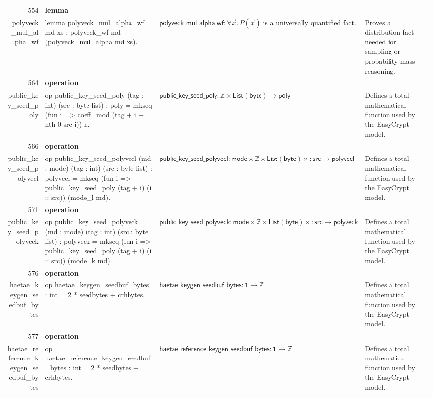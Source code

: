 \documentclass[10pt]{article}
\newcommand{\ec}[1]{\begingroup\ttfamily\scriptsize #1\endgroup}
\begin{document}
\begin{longtable}{r L{0.17\textwidth} L{0.26\textwidth} L{0.27\textwidth} L{0.20\textwidth}}
554 & \textbf{lemma}\\\ec{polyveck\_mul\_alpha\_wf} & \ec{lemma polyveck\_mul\_alpha\_wf md xs : polyveck\_wf md (polyveck\_mul\_alpha md xs).} & \(\mathsf{polyveck\_mul\_alpha\_wf} : \forall \vec{x}.\, P(\vec{x})\) is a universally quantified fact. & Proves a distribution fact needed for sampling or probability mass reasoning. \\
564 & \textbf{operation}\\\ec{public\_key\_seed\_poly} & \ec{op public\_key\_seed\_poly (tag : int) (src : byte list) : poly = mkseq (fun i => coeff\_mod (tag + i + nth 0 src i)) n.} & \(\mathsf{public\_key\_seed\_poly} : \mathbb{Z} \times \mathsf{List}(\mathsf{byte}) \to \mathsf{poly}\) & Defines a total mathematical function used by the EasyCrypt model. \\
566 & \textbf{operation}\\\ec{public\_key\_seed\_polyvecl} & \ec{op public\_key\_seed\_polyvecl (md : mode) (tag : int) (src : byte list) : polyvecl = mkseq (fun i => public\_key\_seed\_poly (tag + i) (i :: src)) (mode\_l md).} & \(\mathsf{public\_key\_seed\_polyvecl} : \mathsf{mode} \times \mathbb{Z} \times \mathsf{List}(\mathsf{byte}) \times \mathsf{: src} \to \mathsf{polyvecl}\) & Defines a total mathematical function used by the EasyCrypt model. \\
571 & \textbf{operation}\\\ec{public\_key\_seed\_polyveck} & \ec{op public\_key\_seed\_polyveck (md : mode) (tag : int) (src : byte list) : polyveck = mkseq (fun i => public\_key\_seed\_poly (tag + i) (i :: src)) (mode\_k md).} & \(\mathsf{public\_key\_seed\_polyveck} : \mathsf{mode} \times \mathbb{Z} \times \mathsf{List}(\mathsf{byte}) \times \mathsf{: src} \to \mathsf{polyveck}\) & Defines a total mathematical function used by the EasyCrypt model. \\
576 & \textbf{operation}\\\ec{haetae\_keygen\_seedbuf\_bytes} & \ec{op haetae\_keygen\_seedbuf\_bytes : int = 2 * seedbytes + crhbytes.} & \(\mathsf{haetae\_keygen\_seedbuf\_bytes} : \mathbf{1} \to \mathbb{Z}\) & Defines a total mathematical function used by the EasyCrypt model. \\
577 & \textbf{operation}\\\ec{haetae\_reference\_keygen\_seedbuf\_bytes} & \ec{op haetae\_reference\_keygen\_seedbuf\_bytes : int = 2 * seedbytes + crhbytes.} & \(\mathsf{haetae\_reference\_keygen\_seedbuf\_bytes} : \mathbf{1} \to \mathbb{Z}\) & Defines a total mathematical function used by the EasyCrypt model. \\

\end{longtable}
\end{document}
